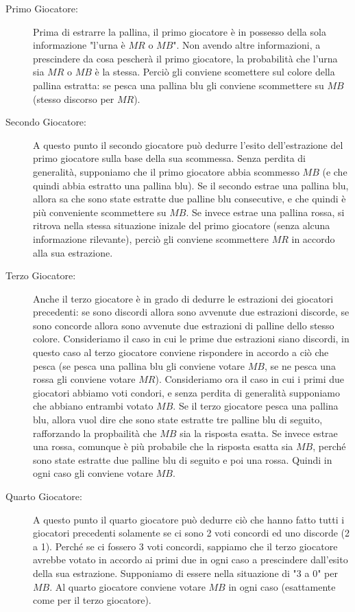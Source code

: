 \begin{description}
    \item[Primo Giocatore:] Prima di estrarre la pallina, il primo giocatore è in possesso della sola informazione "l'urna è $MR$ o $MB$". Non avendo altre informazioni, a prescindere da cosa pescherà il primo giocatore, la probabilità che l'urna sia $MR$ o $MB$ è la stessa. Perciò gli conviene scomettere sul colore della pallina estratta: se pesca una pallina blu gli conviene scommettere su $MB$ (stesso discorso per $MR$).
    \item[Secondo Giocatore:] A questo punto il secondo giocatore può dedurre l'esito dell'estrazione del primo giocatore sulla base della sua scommessa. Senza perdita di generalità, supponiamo che il primo giocatore abbia scommesso $MB$ (e che quindi abbia estratto una pallina blu). Se il secondo estrae una pallina blu, allora sa che sono state estratte due palline blu consecutive, e che quindi è più conveniente scommettere su $MB$. Se invece estrae una pallina rossa, si ritrova nella stessa situazione inizale del primo giocatore (senza alcuna informazione rilevante), perciò gli conviene scommettere $MR$ in accordo alla sua estrazione.
    \item[Terzo Giocatore:] Anche il terzo giocatore è in grado di dedurre le estrazioni dei giocatori precedenti: se sono discordi allora sono avvenute due estrazioni discorde, se sono concorde allora sono avvenute due estrazioni di palline dello stesso colore. Consideriamo il caso in cui le prime due estrazioni siano discordi, in questo caso al terzo giocatore conviene rispondere in accordo a ciò che pesca (se pesca una pallina blu gli conviene votare $MB$, se ne pesca una rossa gli conviene votare $MR$). Consideriamo ora il caso in cui i primi due giocatori abbiamo voti condori, e senza perdita di generalità supponiamo che abbiano entrambi votato $MB$. Se il terzo giocatore pesca una pallina blu, allora vuol dire che sono state estratte tre palline blu di seguito, rafforzando la propbailità che $MB$ sia la risposta esatta. Se invece estrae una rossa, comunque è più probabile che la risposta esatta sia $MB$, perché sono state estratte due palline blu di seguito e poi una rossa. Quindi in ogni caso gli conviene votare $MB$.
    \item[Quarto Giocatore:] A questo punto il quarto giocatore può dedurre ciò che hanno fatto tutti i giocatori precedenti solamente se ci sono 2 voti concordi ed uno discorde (2 a 1). Perché se ci fossero 3 voti concordi, sappiamo che il terzo giocatore avrebbe votato in accordo ai primi due in ogni caso a prescindere dall'esito della sua estrazione. Supponiamo di essere nella situazione di "3 a 0" per $MB$. Al quarto giocatore conviene votare $MB$ in ogni caso (esattamente come per il terzo giocatore).     
\end{description}

